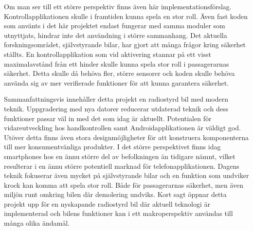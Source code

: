\documentclass[a4paper]{article}
\begin{document}
\vspace{5mm} \noindent
Om man ser till ett större perspektiv finns även här implementationsförslag. Kontrollapplikationen skulle i framtiden kunna spela en stor roll. Även fast koden som använts i det här projektet endast fungerar med samma moduler som utnyttjats, hindrar inte det användning i större sammanhang. Det aktuella forskningsområdet, självstyrande bilar, har gjort att många frågor kring säkerhet ställts. En kontrollapplikation som vid aktivering stannar på ett visst maximalavstånd från ett hinder skulle kunna spela stor roll i passagerarnas säkerhet. Detta skulle då behöva fler, större sensorer och koden skulle behöva använda sig av mer verifierade funktioner för att kunna garantera säkerhet.  







\vspace{5mm} \noindent
Sammanfattningsvis innehåller detta projekt en radiostyrd bil med modern teknik. Uppgradering med nya datorer reducerar utdaterad teknik och dess funktioner passar väl in med det som idag är aktuellt. Potentialen för vidareutveckling hos handkontrollen samt Androidapplikationen är väldigt god. Utöver detta finns även stora designmöjligheter för att konstruera komponenterna till mer konsumentvänliga produkter. I det större perspektivet finns idag smartphones hos en ännu större del av befolkningen än tidigare nämnt, vilket resulterar i en ännu större potentiell marknad för telefonapplikationen. Dagens teknik fokuserar även mycket på självstyrande bilar och en funktion som undviker krock kan komma att spela stor roll. Både för passagerarnas säkerhet, men även miljön runt omkring bilen där demolering undviks. Kort sagt öppnar detta projekt upp för en nyskapande radiostyrd bil där aktuell teknologi är implementerad och bilens funktioner kan i ett makroperspektiv användas till många olika ändamål.





\newpage

\end{document}
